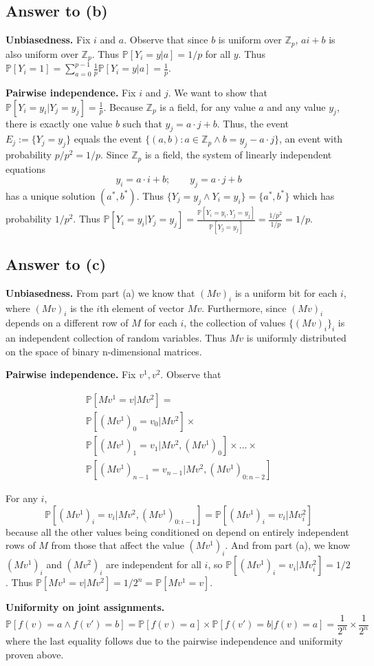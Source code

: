 \documentclass{article}
\begin{document}
\subsection*{Answer to (b)}

\textbf{Unbiasedness.}
Fix $i$ and $a$.  Observe that since $b$ is uniform over $\mathbb{Z}_p$, $ai + b$ is also uniform over $\mathbb{Z}_p$.  Thus $\mathbb{P}[Y_i = y | a] = 1/p$ for all $y$.  Thus $\mathbb{P}[Y_i = 1] = \sum_{a = 0}^{p-1}\frac{1}{p}\mathbb{P}[Y_i = y | a] = \frac{1}{p}$.

\textbf{Pairwise independence.}
Fix $i$ and $j$.
We want to show that $\mathbb{P}[Y_i = y_i | Y_j = y_j] = \frac{1}{p}$.
Because $\mathbb{Z}_p$ is a field, for any value $a$ and any value $y_j$, there is exactly one value $b$ such that $y_j = a \cdot j + b$.
Thus, the event $E_j := \{Y_j = y_j\}$ equals the event $\{(a, b) : a \in \mathbb{Z}_p \wedge b = y_j - a \cdot j\}$, an event with probability $p/p^2 = 1/p$.
Since $\mathbb{Z}_p$ is a field, the system of linearly independent equations
$$
y_i = a \cdot i + b; \qquad y_j = a \cdot j + b
$$
has a unique solution $(a^*, b^*)$.
Thus $\{Y_j = y_j \wedge Y_i = y_i\} = \{a^*, b^*\}$ which has probability $1/p^2$.
Thus $\mathbb{P}[Y_i = y_i | Y_j = y_j] = \frac{\mathbb{P}[Y_i = y_i, Y_j = y_j]}{\mathbb{P}[Y_j = y_j]} = \frac{1/p^2}{1/p} = 1/p$.
\subsection*{Answer to (c)}

\textbf{Unbiasedness.} From part (a) we know that $(Mv)_i$ is a uniform bit for each $i$, where $(Mv)_i$ is the $i$th element of vector $Mv$.  Furthermore, since $(Mv)_i$ depends on a different row of $M$ for each $i$, the collection of values $\{(Mv)_i\}_i$ is an independent collection of random variables.  Thus $Mv$ is uniformly distributed on the space of binary n-dimensional matrices.

\textbf{Pairwise independence.}
Fix $v^1, v^2$.
Observe that 

\begin{multline*}
\mathbb{P}[Mv^1 = v | Mv^2] = \\
\mathbb{P}[(Mv^1)_0 = v_0 | Mv^2] \times \\
\mathbb{P}[(Mv^1)_1 = v_1 | Mv^2, (Mv^1)_0] \times \dots \times \\
\mathbb{P}[(Mv^1)_{n-1} = v_{n-1} | Mv^2, (Mv^1)_{0:n-2}]
\end{multline*}

For any $i$,
$$
\mathbb{P}[(Mv^1)_i = v_i | Mv^2, (Mv^1)_{0:i-1}] =
\mathbb{P}[(Mv^1)_i = v_i | Mv^2_i]
$$
because all the other values being conditioned on depend on entirely independent rows of $M$ from those that affect the value $(Mv^1)_i$.
And from part (a), we know $(Mv^1)_i$ and $(Mv^2)_i$ are independent for all $i$, so $\mathbb{P}[(Mv^1)_i = v_i | Mv^2_i] = 1/2$.
Thus $\mathbb{P}[Mv^1 = v | Mv^2] = 1/2^n = \mathbb{P}[Mv^1 = v]$.

\textbf{Uniformity on joint assignments.}
$$
\mathbb{P}[f(v) = a \wedge f(v') = b] =
\mathbb{P}[f(v) = a]\times\mathbb{P}[f(v') = b | f(v) = a]
= \frac{1}{2^n} \times \frac{1}{2^n}
$$
where the last equality follows due to the pairwise independence and uniformity proven above.
\end{document}
